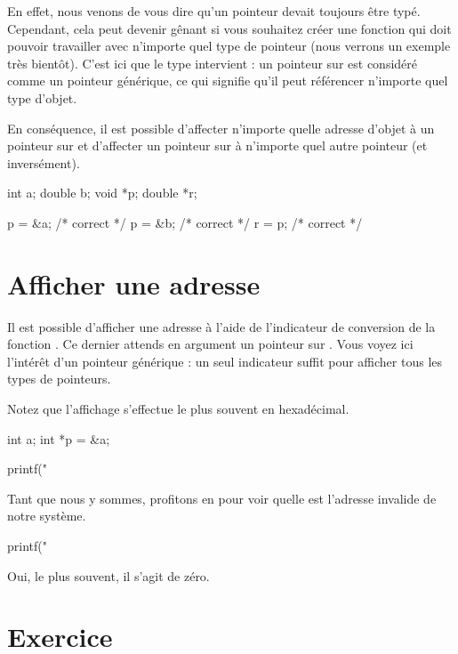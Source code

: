 En effet, nous venons de vous dire qu'un pointeur devait toujours être
typé. Cependant, cela peut devenir gênant si vous souhaitez créer une
fonction qui doit pouvoir travailler avec n'importe quel type de
pointeur (nous verrons un exemple très bientôt). C'est ici que le type
 intervient : un pointeur sur  est considéré
comme un pointeur générique, ce qui signifie qu'il peut référencer
n'importe quel type d'objet.

En conséquence, il est possible d'affecter n'importe quelle adresse
d'objet à un pointeur sur  et d'affecter un pointeur sur
 à n'importe quel autre pointeur (et inversément).

\begin{C}
int a;
double b;
void *p;
double *r;

p = &a; /* correct */
p = &b; /* correct */
r = p; /* correct */
\end{C}

\section{Afficher une adresse}\label{afficher-une-adresse}

Il est possible d'afficher une adresse à l'aide de l'indicateur de
conversion  de la fonction . Ce dernier
attends en argument un pointeur sur . Vous voyez ici
l'intérêt d'un pointeur générique : un seul indicateur suffit pour
afficher tous les types de pointeurs.

Notez que l'affichage s'effectue le plus souvent en hexadécimal.

\begin{C}
int a;
int *p = &a;

printf("%
\end{C}

Tant que nous y sommes, profitons en pour voir quelle est l'adresse
invalide de notre système.

\begin{C}
printf("%
\end{C}

\begin{secretbox}
Oui, le plus souvent, il s'agit de zéro. 
\end{secretbox}


\section{Exercice}
\label{exercice-12}


